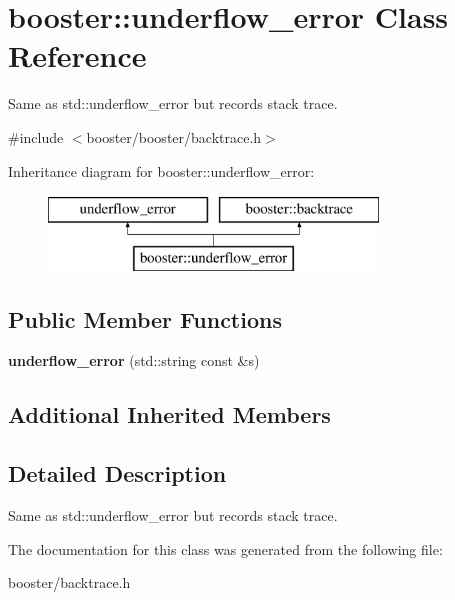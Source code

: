 \section{booster\-:\-:underflow\-\_\-error Class Reference}
\label{classbooster_1_1underflow__error}


Same as std\-::underflow\-\_\-error but records stack trace.  




{\ttfamily \#include $<$booster/booster/backtrace.\-h$>$}

Inheritance diagram for booster\-:\-:underflow\-\_\-error\-:\begin{figure}[H]
\begin{center}
\leavevmode
\includegraphics[height=2.000000cm]{classbooster_1_1underflow__error}
\end{center}
\end{figure}
\subsection*{Public Member Functions}
\begin{DoxyCompactItemize}
\item 
{\bfseries underflow\-\_\-error} (std\-::string const \&s)\label{classbooster_1_1underflow__error_ac5ae1a55ac50a0e55af0f6610c4d8dc1}

\end{DoxyCompactItemize}
\subsection*{Additional Inherited Members}


\subsection{Detailed Description}
Same as std\-::underflow\-\_\-error but records stack trace. 

The documentation for this class was generated from the following file\-:\begin{DoxyCompactItemize}
\item 
booster/backtrace.\-h\end{DoxyCompactItemize}
